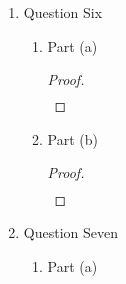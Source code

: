 \documentclass{article}
\begin{document}
\begin{enumerate}
    \item Question Six
    \begin{enumerate}
        \item Part (a)
        \begin{proof}
            \begin{align}
                &
            \end{align}
        \end{proof}
        \item Part (b)
        \begin{proof}
            \begin{align}
                &
            \end{align}
        \end{proof}
    \end{enumerate}
    \item Question Seven
    \begin{enumerate}
        \item Part (a)
    \end{enumerate}
\end{enumerate}
\end{document}

